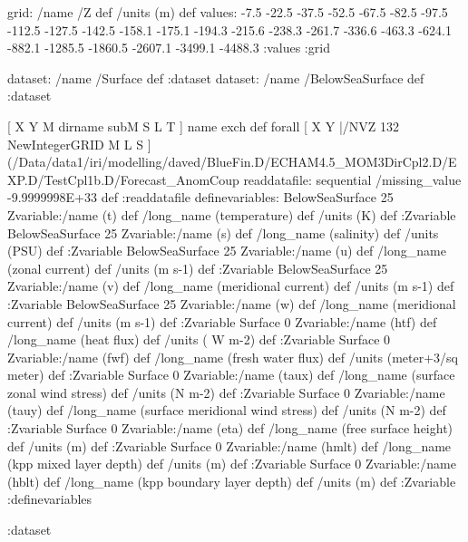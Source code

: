 \begin{ingrid}
grid:
/name /Z def
/units (m) def
values:
-7.5 -22.5 -37.5 -52.5 -67.5 -82.5 -97.5 -112.5 -127.5 -142.5 -158.1 
-175.1 -194.3 -215.6 -238.3 -261.7 -336.6 -463.3 -624.1 -882.1 -1285.5 -1860.5 
-2607.1 -3499.1 -4488.3
:values
:grid

dataset: /name /Surface def :dataset
dataset: /name /BelowSeaSurface def :dataset


[ X Y M dirname subM S L T ] { name exch def } forall
[ X Y |/NVZ 132  NewIntegerGRID M L S ]
(/Data/data1/iri/modelling/daved/BlueFin.D/ECHAM4.5_MOM3DirCpl2.D/EXP.D/TestCpl1b.D/Forecast_AnomCoup%
readdatafile:
sequential
/missing_value  -9.9999998E+33 def
:readdatafile
definevariables:
BelowSeaSurface 25 Zvariable:/name (t) def /long_name (temperature)  def /units (K) def :Zvariable
BelowSeaSurface 25 Zvariable:/name (s) def /long_name (salinity) def /units (PSU) def :Zvariable
BelowSeaSurface 25 Zvariable:/name (u) def /long_name (zonal current)  def /units (m s-1) def :Zvariable
BelowSeaSurface 25 Zvariable:/name (v) def /long_name (meridional current)  def /units (m s-1) def :Zvariable
BelowSeaSurface 25 Zvariable:/name (w) def /long_name (meridional current)  def /units (m s-1) def :Zvariable
Surface 0 Zvariable:/name (htf) def /long_name (heat flux) def /units ( W m-2) def :Zvariable
Surface 0 Zvariable:/name (fwf) def /long_name (fresh water flux) def /units (meter+3/sq meter) def :Zvariable
Surface 0 Zvariable:/name (taux) def /long_name (surface zonal wind stress) def /units (N m-2) def :Zvariable
Surface 0 Zvariable:/name (tauy) def /long_name (surface meridional wind stress) def /units (N m-2) def :Zvariable
Surface 0 Zvariable:/name (eta) def /long_name (free surface height) def /units (m) def :Zvariable
Surface 0 Zvariable:/name (hmlt) def /long_name (kpp mixed layer depth) def /units (m) def :Zvariable
Surface 0 Zvariable:/name (hblt) def /long_name (kpp boundary layer depth) def /units (m) def :Zvariable
:definevariables

:dataset
\end{ingrid}



